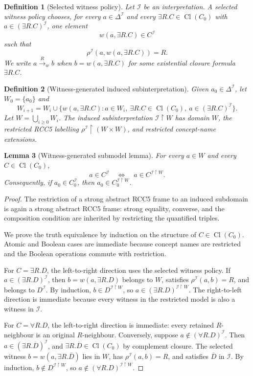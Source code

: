 \documentclass[11pt]{article}
\newtheorem{definition}{Definition}[section]
\newtheorem{lemma}[definition]{Lemma}
\theoremstyle{remark}
\newcommand{\Cl}{\operatorname{Cl}}
\newcommand{\I}{\mathcal{I}}
\begin{document}
\begin{definition}[Selected witness policy]
Let $\I$ be an interpretation.  A selected witness policy chooses, for every $a\in\Delta^\I$ and every $\exists R.C\in\Cl(C_0)$ with $a\in(\exists R.C)^\I$, one element
\[
w(a,\exists R.C)\in C^\I
\]
such that
\[
\rho^\I(a,w(a,\exists R.C))=R.
\]
We write $a\xrightarrow{R}_{w}b$ when $b=w(a,\exists R.C)$ for some existential closure formula $\exists R.C$.
\end{definition}

\begin{definition}[Witness-generated induced subinterpretation]
Given $a_0\in\Delta^\I$, let $W_0=\{a_0\}$ and
\[
W_{i+1}=W_i\cup\{w(a,\exists R.C):a\in W_i,\ \exists R.C\in\Cl(C_0),\ a\in(\exists R.C)^\I\}.
\]
Let $W=\bigcup_{i\ge 0}W_i$.  The induced subinterpretation $\I\upharpoonright W$ has domain $W$, the restricted RCC5 labelling $\rho^\I\upharpoonright(W\times W)$, and restricted concept-name extensions.
\end{definition}

\begin{lemma}[Witness-generated submodel lemma]\label{lem:witness-submodel}
For every $a\in W$ and every $C\in\Cl(C_0)$,
\[
a\in C^\I \quad\Longleftrightarrow\quad a\in C^{\I\upharpoonright W}.
\]
Consequently, if $a_0\in C_0^\I$, then $a_0\in C_0^{\I\upharpoonright W}$.
\end{lemma}
\begin{proof}
The restriction of a strong abstract RCC5 frame to an induced subdomain is again a strong abstract RCC5 frame: strong equality, converse, and the composition condition are inherited by restricting the quantified triples.

We prove the truth equivalence by induction on the structure of $C\in\Cl(C_0)$.  Atomic and Boolean cases are immediate because concept names are restricted and the Boolean operations commute with restriction.

For $C=\exists R.D$, the left-to-right direction uses the selected witness policy.  If $a\in(\exists R.D)^\I$, then $b=w(a,\exists R.D)$ belongs to $W$, satisfies $\rho^\I(a,b)=R$, and belongs to $D^\I$.  By induction, $b\in D^{\I\upharpoonright W}$, so $a\in(\exists R.D)^{\I\upharpoonright W}$.  The right-to-left direction is immediate because every witness in the restricted model is also a witness in $\I$.

For $C=\forall R.D$, the left-to-right direction is immediate: every retained $R$-neighbour is an original $R$-neighbour.  Conversely, suppose $a\notin(\forall R.D)^\I$.  Then $a\in(\exists R.\overline D)^\I$, and $\exists R.\overline D\in\Cl(C_0)$ by complement closure.  The selected witness $b=w(a,\exists R.\overline D)$ lies in $W$, has $\rho^\I(a,b)=R$, and satisfies $\overline D$ in $\I$.  By induction, $b\notin D^{\I\upharpoonright W}$, so $a\notin(\forall R.D)^{\I\upharpoonright W}$.
\end{proof}
\end{document}
